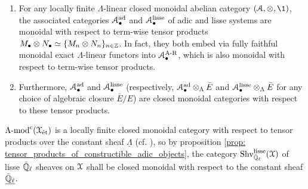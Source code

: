             \begin{proposition} \label{prop: tensor_products_of_constructible_adic_objects}
                \noindent
                \begin{enumerate}
                    \item \cite[Proposition 6.1]{laszlo_olsson_adic_sheaves_on_artin_stacks_2} For any locally finite $\Lambda$-linear closed monoidal abelian category $(\calA, \tensor, \1)$, the associated categories $\mathcal{A}_{\bullet}^{\mathrm{ad}}$ and $\mathcal{A}_{\bullet}^{\mathrm{lisse}}$ of adic and lisse systems are monoidal with respect to term-wise tensor products $M_{\bullet} \tensor N_{\bullet} \cong \{M_n \tensor N_n\}_{n \in \Z}$. In fact, they both embed via fully faithful monoidal exact $\Lambda$-linear functors into $\mathcal{A}_{\bullet}^{\mathrm{A\text{-}R}}$, which is also monoidal with respect to term-wise tensor products. 
                    \item \cite[Theorem III.12.2 and Appendix A]{kiehl_weissauer_weil_conjecture_perverse_sheaves_and_l_adic_fourier_transform} Furthermore, $\mathcal{A}_{\bullet}^{\mathrm{ad}}$ and $\mathcal{A}_{\bullet}^{\mathrm{lisse}}$ (respectively, $\calA_{\bullet}^{\ad} \tensor_{\Lambda} \bar{E}$ and $\calA_{\bullet}^{\lisse} \tensor_{\Lambda} \bar{E}$ for any choice of algebraic closure $\bar{E}/E$) are closed monoidal categories with respect to these tensor products.
                \end{enumerate}
            \end{proposition}
            \begin{example} \label{def: tensor_products_of_constructible_adic_sheaves}
                $\Lambda\text{-}\mathrm{mod}^{\mathrm{c}}(\mathcal{X}_{\mathrm{\acute{e}t}})$ is a locally finite closed monoidal category with respect to tensor products over the constant sheaf $\underline{\Lambda}$ (cf. \cite[\href{https://stacks.math.columbia.edu/tag/093P}{Tag 093P}]{stacks}), so by proposition \ref{prop: tensor_products_of_constructible_adic_objects}, the category $\mathrm{Shv}_{\bar{\mathbb{Q}}_{\ell}}^{\mathrm{lisse}}(\mathcal{X})$ of lisse $\bar{\mathbb{Q}}_{\ell}$ sheaves on $\mathcal{X}$ shall be closed monoidal with respect to the constant sheaf $\underline{\bar{\mathbb{Q}}_{\ell}}$.
            \end{example}
            
